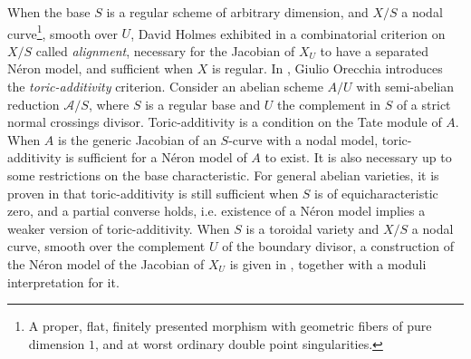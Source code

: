 \documentclass[a4paper,10pt,twoside]{article}
\theoremstyle{definition}
\theoremstyle{remark}
\begin{document}
When the base $S$ is a regular scheme of arbitrary dimension, and $X/S$ a nodal curve\footnote{A proper, flat, finitely presented morphism with geometric fibers of pure dimension $1$, and at worst ordinary double point singularities.}, smooth over $U$, David Holmes exhibited in \cite{Holmes} a combinatorial criterion on $X/S$ called \emph{alignment}, necessary for the Jacobian of $X_U$ to have a separated Néron model, and sufficient when $X$ is regular. In \cite{GiulioToricAdd}, Giulio Orecchia introduces the \emph{toric-additivity} criterion. Consider an abelian scheme $A/U$ with semi-abelian reduction $\mathcal{A}/S$, where $S$ is a regular base and $U$ the complement in $S$ of a strict normal crossings divisor. Toric-additivity is a condition on the Tate module of $A$. When $A$ is the generic Jacobian of an $S$-curve with a nodal model, toric-additivity is sufficient for a N\'eron model of $A$ to exist. It is also necessary up to some restrictions on the base characteristic. For general abelian varieties, it is proven in \cite{GiulioMonodromyCriterion} that toric-additivity is still sufficient when $S$ is of equicharacteristic zero, and a partial converse holds, i.e. existence of a N\'eron model implies a weaker version of toric-additivity. When $S$ is a toroidal variety and $X/S$ a nodal curve, smooth over the complement $U$ of the boundary divisor, a construction of the Néron model of the Jacobian of $X_U$ is given in \cite{HMOPModelsJacobians}, together with a moduli interpretation for it.

\end{document}
